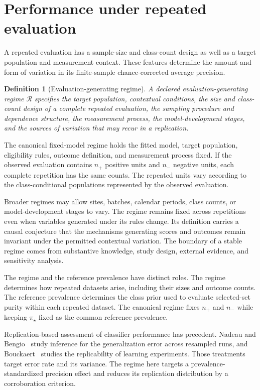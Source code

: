 \documentclass[11pt]{article}
\newcommand{\Regime}{\mathcal{R}}
\newtheorem{definition}{Definition}
\theoremstyle{remark}
\begin{document}
\section{Performance under repeated evaluation}

A repeated evaluation has a sample-size and class-count design as well as a target population and measurement context. These features determine the amount and form of variation in its finite-sample chance-corrected average precision.

\begin{definition}[Evaluation-generating regime]
A declared evaluation-generating regime $\Regime$ specifies the target population, contextual conditions, the size and class-count design of a complete repeated evaluation, the sampling procedure and dependence structure, the measurement process, the model-development stages, and the sources of variation that may recur in a replication.
\end{definition}

The canonical fixed-model regime holds the fitted model, target population, eligibility rules, outcome definition, and measurement process fixed. If the observed evaluation contains $n_+$ positive units and $n_-$ negative units, each complete repetition has the same counts. The repeated units vary according to the class-conditional populations represented by the observed evaluation.

Broader regimes may allow sites, batches, calendar periods, class counts, or model-development stages to vary. The regime remains fixed across repetitions even when variables generated under its rules change. Its definition carries a causal conjecture that the mechanisms generating scores and outcomes remain invariant under the permitted contextual variation. The boundary of a stable regime comes from substantive knowledge, study design, external evidence, and sensitivity analysis.

The regime and the reference prevalence have distinct roles. The regime determines how repeated datasets arise, including their sizes and outcome counts. The reference prevalence determines the class prior used to evaluate selected-set purity within each repeated dataset. The canonical regime fixes $n_+$ and $n_-$ while keeping $\pi_\star$ fixed as the common reference prevalence.

Replication-based assessment of classifier performance has precedent. Nadeau and Bengio~\cite{nadeau2003inference} study inference for the generalization error across resampled runs, and Bouckaert~\cite{bouckaert2004estimating} studies the replicability of learning experiments. Those treatments target error rate and its variance. The regime here targets a prevalence-standardized precision effect and reduces its replication distribution by a corroboration criterion.
\end{document}
